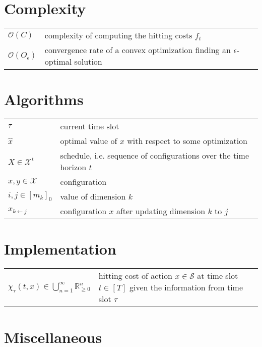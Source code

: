 \section*{Complexity}

\begin{tabularx}{\textwidth}{p{100pt}X}
    $\mathcal{O}(C)$ & complexity of computing the hitting costs $f_t$ \\
    $\mathcal{O}(O_{\epsilon})$ & convergence rate of a convex optimization finding an $\epsilon$-optimal solution \\
\end{tabularx}

\section*{Algorithms}

\begin{tabularx}{\textwidth}{p{100pt}X}
    $\tau$ & current time slot \\
    $\hat{x}$ & optimal value of $x$ with respect to some optimization \\
    $X \in \mathcal{X}^t$ & schedule, i.e. sequence of configurations over the time horizon $t$ \\
    $x, y \in \mathcal{X}$ & configuration \\
    $i, j \in [m_k]_0$ & value of dimension $k$ \\
    $x_{k \gets j}$ & configuration $x$ after updating dimension $k$ to $j$ \\
\end{tabularx}

\section*{Implementation}

\begin{tabularx}{\textwidth}{p{100pt}X}
    $\chi_{\tau}(t, x) \in \bigcup_{n=1}^{\infty} \mathbb{R}_{\geq 0}^n$ & hitting cost of action $x \in \mathcal{S}$ at time slot $t \in [T]$ given the information from time slot $\tau$ \\
\end{tabularx}

\section*{Miscellaneous}

